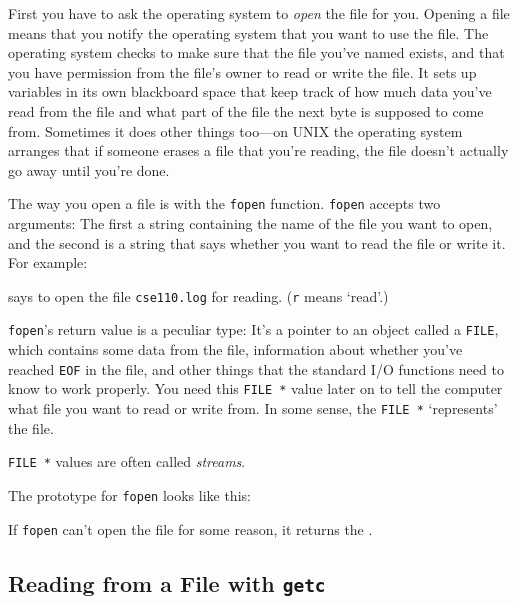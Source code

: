 First you have to ask the operating system to {\em open} the file for
you.  Opening a file means that you notify the operating system that you
want to use the file.  The operating system checks to make sure that the
file you've named exists, and that you have permission from the file's
owner to read or write the file.  It sets up variables in its own
blackboard space that keep track of how much data you've read from the
file and what part of the file the next byte is supposed to come from.
Sometimes it does other things too---on {\sc UNIX} the operating system
arranges that if someone erases a file that you're reading, the file
doesn't actually go away until you're done.

The way you open a file is with the {\tt fopen} function.  {\tt fopen}
accepts two arguments:  The first a string containing the name of the
file you want to open, and the second is a string that says whether you
want to read the file or write it.  For example:

\begin{flushleft}
\verb% fopen("cse110.log", "r"); % 
\end{flushleft}

\noindent says to open the file {\tt cse110.log} for reading.  ({\tt r}
means `read'.)

{\tt fopen}'s return value is a peculiar type: It's a pointer to an
object called a {\tt FILE}, which contains some data from the file,
information about whether you've reached {\tt EOF} in the file, and
other things that the standard I/O functions need to know to work
properly. You need this {\tt FILE *} value later on to tell the computer
what file you want to read or write from.  In some sense, the {\tt FILE
*} `represents' the file.

{\tt FILE *} values are often called {\em streams}\/.

The prototype for {\tt fopen} looks like this:

\begin{flushleft}
\verb% FILE * fopen(char *filename, char *type); % \\*
\end{flushleft}

If {\tt fopen} can't open the file for some reason, it returns the \np.

\subsection{Reading from a File with {\tt getc}}

